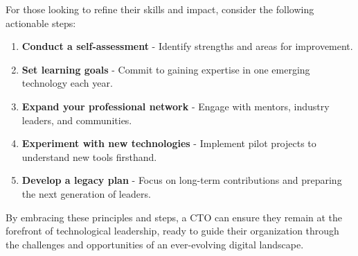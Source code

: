 For those looking to refine their skills and impact, consider the following actionable steps:

\begin{enumerate}
    \item \textbf{Conduct a self-assessment} - Identify strengths and areas for improvement.
    \item \textbf{Set learning goals} - Commit to gaining expertise in one emerging technology each year.
    \item \textbf{Expand your professional network} - Engage with mentors, industry leaders, and communities.
    \item \textbf{Experiment with new technologies} - Implement pilot projects to understand new tools firsthand.
    \item \textbf{Develop a legacy plan} - Focus on long-term contributions and preparing the next generation of leaders.
\end{enumerate}

By embracing these principles and steps, a CTO can ensure they remain at the forefront of technological leadership, ready to guide their organization through the challenges and opportunities of an ever-evolving digital landscape.